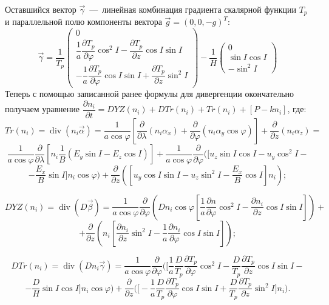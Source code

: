 \documentclass[14pt, a4paper, fleqn]{extarticle}
\renewcommand{\div}{\operatorname{div}}
\begin{document}
Оставшийся вектор $\vec{\gamma}$~---~линейная комбинация градиента скалярной функции $T_p$ и параллельной полю компоненты вектора $\vec{g} = (0, 0, -g)^T$: $$\vec{\gamma} = \dfrac{1}{T_p}\left(\begin{array}{crl}
0\\
\dfrac{1}{a}\dfrac{\partial T_p}{\partial \varphi}\cos^2 I - \dfrac{\partial T_p}{\partial z}\cos I\sin I\\
-\dfrac{1}{a}\dfrac{\partial T_p}{\partial \varphi}\cos I\sin I + \dfrac{\partial T_p}{\partial z}\sin^2 I
\end{array}\right) -\dfrac{1}{H} \left(\begin{array}{crl}
0\\
\sin I\cos I\\
-\sin^2 I
\end{array}\right)$$
Теперь с помощью записанной ранее формулы для дивергенции окончательно получаем уравнение $\dfrac{\partial n_i}{\partial t} = DYZ(n_i)+DTr(n_i)+Tr(n_i)+[P-kn_i]$, где: $$Tr(n_i) = \div (n_i\vec{\alpha}) = \dfrac{1}{a\cos\varphi}\left[\dfrac{\partial}{\partial\lambda}(n_i\alpha_x) + \dfrac{\partial}{\partial\varphi}(n_i \alpha_y\cos\varphi) \right]+\dfrac{\partial}{\partial z}(n_i \alpha_z)=$$ $$\dfrac{1}{a\cos\varphi}\dfrac{\partial}{\partial\lambda}\left[n_i\dfrac{1}{B}(E_y\sin I - E_z\cos I)\right]+\dfrac{1}{a\cos\varphi}\dfrac{\partial}{\partial\varphi}\bigg(\bigg[u_z\sin I \cos I - u_y\cos^2 I -$$ $$- \dfrac{E_x}{B}\sin I\bigg]n_i\cos\varphi\bigg)+\dfrac{\partial}{\partial z}\left(\left[u_y\cos I \sin I -u_z\sin^2 I - \dfrac{E_x}{B}\cos I\right]n_i\right);$$

$$DYZ(n_i) = \div (D\vec{\beta}) = \dfrac{1}{a\cos\varphi}\dfrac{\partial}{\partial\varphi}\left(Dn_i\cos\varphi\left[\dfrac{1}{a}\dfrac{\partial n}{\partial\varphi} \cos^2 I -\dfrac{\partial n_i}{\partial z}\cos I\sin I\right]\right)+$$ $$ + \dfrac{\partial}{\partial z}\left(n_i\left[\dfrac{\partial n_i}{\partial z}\sin^2 I - \dfrac{1}{a}\dfrac{\partial n_i}{\partial\varphi}\cos I \sin I\right]\right);$$ 

$$DTr(n_i) = \div(Dn_i\vec{\gamma}) = \dfrac{1}{a\cos\varphi}\dfrac{\partial}{\partial \varphi}\bigg(\bigg[\dfrac{1}{a}\dfrac{D}{T_p}\dfrac{\partial T_p}{\partial\varphi}\cos^2 I-\dfrac{D}{T_p}\dfrac{\partial T_p}{\partial z}\cos I \sin I - $$ $$-\dfrac{D}{H}\sin I \cos I\bigg]n_i\cos\varphi\bigg) + \dfrac{\partial}{\partial z}\bigg(\bigg[-\dfrac{1}{a}\dfrac{D}{T_p}\dfrac{\partial T_p}{\partial \varphi}\cos I \sin I + \dfrac{D}{T_p}\dfrac{\partial T_p}{\partial z}\sin^2 I\bigg]n_i\bigg).$$
\end{document}
